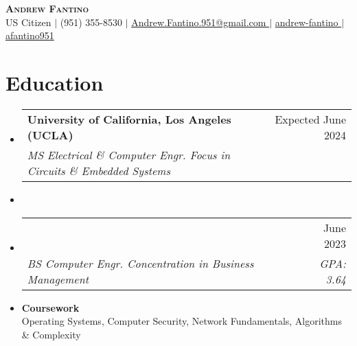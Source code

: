 \documentclass[letterpaper,11pt]{article}
\makeatletter
\newcommand{\resumeSubheading}[4]{
  \vspace{-2pt}\item
    \begin{tabular*}{0.97\textwidth}[t]{l@{\extracolsep{\fill}}r}
      \textbf{#1} & #2 \\
      \textit{\small#3} & \textit{\small #4} \\
    \end{tabular*}\vspace{-7pt}
}
\newcommand{\resumeSubHeadingListStart}{\begin{itemize}[leftmargin=0.15in, label={}]}
\newcommand{\resumeSubHeadingListEnd}{\end{itemize}}
\makeatother
\begin{document}
\begin{center}
  \vspace{1.75em}
  \textbf{\Huge \scshape Andrew Fantino} \\ \vspace{3pt}
  \small US Citizen $|$
  \small {} (951) 355-8530 $|$ 
  \href{mailto:andrew.fantino.951@gmail.com}{  Andrew.Fantino.951@gmail.com } $|$ 
  \href{https://linkedin.com/in/andrew-fantino/}{  andrew-fantino } $|$
  \href{https://github.com/afantino951}{  afantino951} 
\end{center}

\section{Education}
  \resumeSubHeadingListStart
    \resumeSubheading
      {University of California, Los Angeles (UCLA)}{Expected June 2024}
      {MS Electrical \& Computer Engr. Focus in Circuits \& Embedded Systems}{}
      \vspace{-40pt}\item

    \resumeSubheading
      {}{June 2023}
      {BS Computer Engr. Concentration in Business Management}{GPA: 3.64}
      \vspace{-6pt}\item
      \textbf{Coursework} \\

        \small\quad Operating Systems, Computer Security, Network Fundamentals, Algorithms \& Complexity
        
        

  \resumeSubHeadingListEnd
\end{document}
